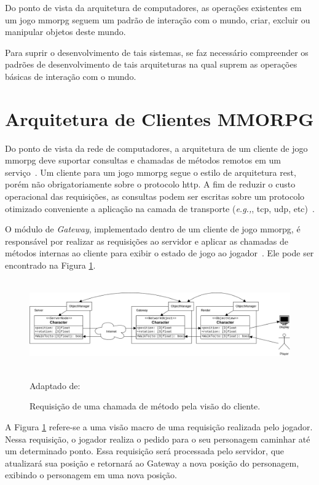 Do ponto de vista da arquitetura de computadores, as operações existentes em um jogo \ac{mmorpg} seguem um padrão de interação com o mundo, criar, excluir ou manipular objetos deste mundo.

%
Para suprir o desenvolvimento de tais sistemas, se faz necessário compreender os padrões de desenvolvimento de tais arquiteturas na qual suprem as operações básicas de interação com o mundo.


\section{Arquitetura de Clientes MMORPG}
\label{sec:cliente}



Do ponto de vista da rede de computadores, a arquitetura de um cliente de jogo \ac{mmorpg} deve suportar consultas e chamadas de métodos remotos em um serviço~\cite{albion_online_unite}.
%
Um cliente para um jogo \ac{mmorpg} segue o estilo de arquitetura \ac{rest}, porém não obrigatoriamente sobre o protocolo \ac{http}.
%
A fim de reduzir o custo operacional das requisições, as consultas podem ser escritas sobre um protocolo otimizado conveniente a aplicação na camada de transporte (\textit{e.g.,}, \ac{tcp}, \ac{udp}, etc)~\cite{albion_online_unite, stephenclarkewillson2017}.

O módulo de \textit{Gateway}, implementado dentro de um cliente de jogo \ac{mmorpg}, é responsável por realizar as requisições ao servidor e aplicar as chamadas de métodos internas ao cliente para exibir o estado de jogo ao jogador~\cite{albion_online_unite}.
%
Ele pode ser encontrado na Figura \ref{fig:gateway}.


\begin{figure}[htb!]
\caption{Requisição de uma chamada de método pela visão do cliente.}
\label{fig:gateway}
\includegraphics[height=3.8cm]{img/cap2/gateway.png}
\centering

Adaptado de:~\cite{albion_online_unite}
\end{figure}



A Figura \ref{fig:gateway} refere-se a uma visão macro de uma requisição realizada pelo jogador.
%
Nessa requisição, o jogador realiza o pedido para o seu personagem caminhar até um determinado ponto.
%
Essa requisição será processada pelo servidor, que atualizará sua posição e retornará ao Gateway a nova posição do personagem, exibindo o personagem em uma nova posição.



